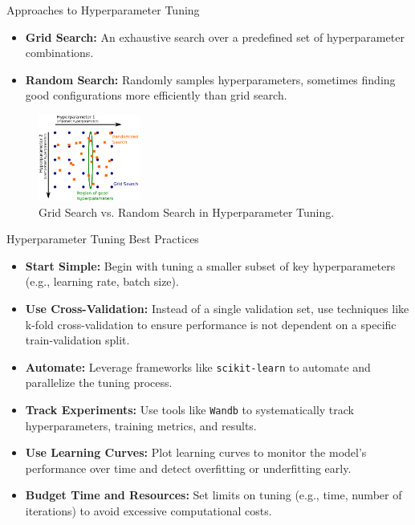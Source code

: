 \documentclass[serif, aspectratio=169]{beamer}
\begin{document}
\begin{frame}{Approaches to Hyperparameter Tuning}
    \begin{itemize}
        \item \textbf{Grid Search:} An exhaustive search over a predefined set of hyperparameter combinations.
        \item \textbf{Random Search:} Randomly samples hyperparameters, sometimes finding good configurations more efficiently than grid search.
    \end{itemize}
    \begin{figure}
        \centering
        \includegraphics[width=0.3\textwidth]{pic/grid_vs_random_search.png}
        \caption{Grid Search vs. Random Search in Hyperparameter Tuning.}
        \label{fig:hyperparameter_tuning}
    \end{figure}
\end{frame}

\begin{frame}{Hyperparameter Tuning Best Practices}
    \begin{itemize}
        \item \textbf{Start Simple:} Begin with tuning a smaller subset of key hyperparameters (e.g., learning rate, batch size).
        \item \textbf{Use Cross-Validation:} Instead of a single validation set, use techniques like k-fold cross-validation to ensure performance is not dependent on a specific train-validation split.
        \item \textbf{Automate:} Leverage frameworks like \texttt{scikit-learn} to automate and parallelize the tuning process.
        \item \textbf{Track Experiments:} Use tools like \texttt{Wandb} to systematically track hyperparameters, training metrics, and results.
        \item \textbf{Use Learning Curves:} Plot learning curves to monitor the model's performance over time and detect overfitting or underfitting early.
        \item \textbf{Budget Time and Resources:} Set limits on tuning (e.g., time, number of iterations) to avoid excessive computational costs.
    \end{itemize}
\end{frame}
\end{document}
